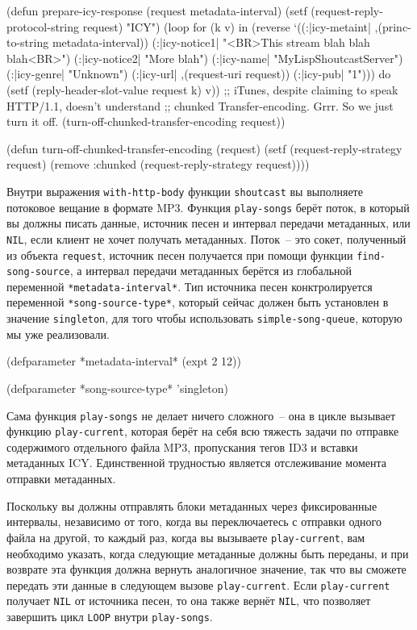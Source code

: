 \begin{myverb}
(defun prepare-icy-response (request metadata-interval)
  (setf (request-reply-protocol-string request) "ICY")
  (loop for (k v) in (reverse
       `((:|icy-metaint| ,(princ-to-string metadata-interval))
         (:|icy-notice1| "<BR>This stream blah blah blah<BR>")
         (:|icy-notice2| "More blah")
         (:|icy-name|    "MyLispShoutcastServer")
         (:|icy-genre|   "Unknown")
         (:|icy-url|     ,(request-uri request))
         (:|icy-pub|     "1")))
     do (setf (reply-header-slot-value request k) v))
  ;; iTunes, despite claiming to speak HTTP/1.1, doesn't understand
  ;; chunked Transfer-encoding. Grrr. So we just turn it off.
  (turn-off-chunked-transfer-encoding request))

(defun turn-off-chunked-transfer-encoding (request)
  (setf (request-reply-strategy request)
        (remove :chunked (request-reply-strategy request))))
\end{myverb}

Внутри выражения \lstinline{with-http-body} функции \lstinline{shoutcast} вы выполняете потоковое
вещание в формате MP3.  Функция \lstinline{play-songs} берёт поток, в который вы должны писать
данные, источник песен и интервал передачи метаданных, или \lstinline{NIL}, если клиент не
хочет получать метаданных.  Поток~-- это сокет, полученный из объекта \lstinline{request},
источник песен получается при помощи функции \lstinline{find-song-source}, а интервал передачи
метаданных берётся из глобальной переменной \lstinline{*metadata-interval*}.  Тип источника
песен конктролируется переменной \lstinline{*song-source-type*}, который сейчас должен быть
установлен в значение \lstinline{singleton}, для того чтобы использовать
\lstinline{simple-song-queue}, которую мы уже реализовали.

\begin{myverb}
(defparameter *metadata-interval* (expt 2 12))

(defparameter *song-source-type* 'singleton)
\end{myverb}

Сама функция \lstinline{play-songs} не делает ничего сложного~-- она в цикле вызывает функцию
\lstinline{play-current}, которая берёт на себя всю тяжесть задачи по отправке содержимого
отдельного файла MP3, пропускания тегов ID3 и вставки метаданных ICY.  Единственной
трудностью является отслеживание момента отправки метаданных.

Поскольку вы должны отправлять блоки метаданных через фиксированные интервалы, независимо
от того, когда вы переключаетесь с отправки одного файла на другой, то каждый раз, когда вы
вызываете \lstinline{play-current}, вам необходимо указать, когда следующие метаданные должны
быть переданы, и при возврате эта функция должна вернуть аналогичное значение, так что вы
сможете передать эти данные в следующем вызове \lstinline{play-current}.  Если
\lstinline{play-current} получает \lstinline{NIL} от источника песен, то она также вернёт
\lstinline{NIL}, что позволяет завершить цикл \lstinline{LOOP} внутри \lstinline{play-songs}.

